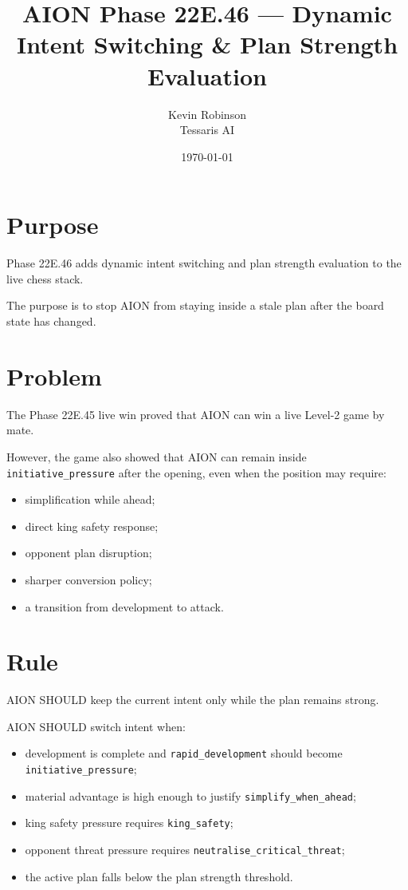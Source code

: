\documentclass[11pt,a4paper]{article}
\title{\textbf{AION Phase 22E.46 --- Dynamic Intent Switching \& Plan Strength Evaluation}}
\author{Kevin Robinson\\Tessaris AI}
\date{\today}
\begin{document}
\maketitle

\section{Purpose}

Phase 22E.46 adds dynamic intent switching and plan strength evaluation to the live chess stack.

The purpose is to stop AION from staying inside a stale plan after the board state has changed.

\section{Problem}

The Phase 22E.45 live win proved that AION can win a live Level-2 game by mate.

However, the game also showed that AION can remain inside \texttt{initiative\_pressure} after the opening, even when the position may require:

\begin{itemize}
  \item simplification while ahead;
  \item direct king safety response;
  \item opponent plan disruption;
  \item sharper conversion policy;
  \item a transition from development to attack.
\end{itemize}

\section{Rule}

AION SHOULD keep the current intent only while the plan remains strong.

AION SHOULD switch intent when:

\begin{itemize}
  \item development is complete and \texttt{rapid\_development} should become \texttt{initiative\_pressure};
  \item material advantage is high enough to justify \texttt{simplify\_when\_ahead};
  \item king safety pressure requires \texttt{king\_safety};
  \item opponent threat pressure requires \texttt{neutralise\_critical\_threat};
  \item the active plan falls below the plan strength threshold.
\end{itemize}
\end{document}
